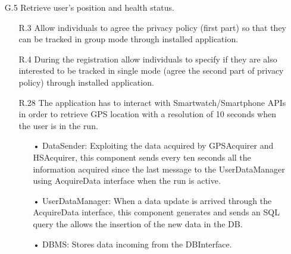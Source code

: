 \begin{enumerate}
\item [G.5] Retrieve user's position and health status.
	\begin{enumerate}
	\item [R.3] Allow individuals to agree the privacy policy (first part) so that they can be tracked in group mode through installed application.  
	\item [R.4] During the registration allow individuals to specify if they are also interested to be tracked in single mode (agree the second part of privacy policy) through installed application. 
	\item [R.28] The application has to interact with Smartwatch/Smartphone APIs in order to retrieve GPS location with a resolution of 10 seconds when the user is in the run.
		\begin{enumerate}
		\item[•] DataSender: Exploiting the data acquired by GPSAcquirer and HSAcquirer, this component sends every ten seconds all the information acquired since the last message to the UserDataManager using AcquireData interface when the run is active.
		\item[•] UserDataManager: When a data update is arrived through the AcquireData interface, this component generates and sends an SQL query the allows the insertion of the new data in the DB.
		\item[•] DBMS: Stores data incoming from the DBInterface.
		\end{enumerate}	
	\end{enumerate}
	

\end{enumerate}
